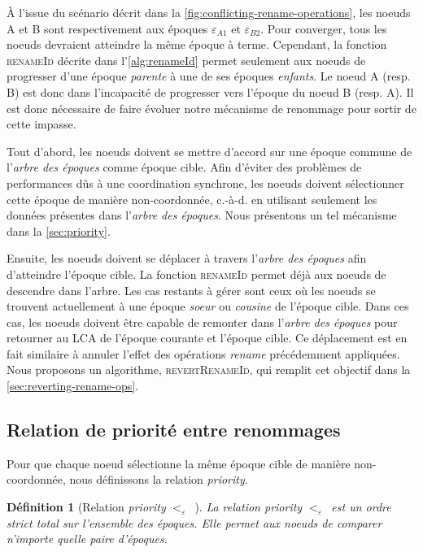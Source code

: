 \documentclass[12pt]{thesul}
\newtheorem{definition}{Définition}
\newcommand{\ie}{c.-à-d. }
\newcommand{\epoch}[1]{$\varepsilon_{#1}$}
\newcommand{\lepoch}{$<_{\varepsilon}$~}
\begin{document}
À l'issue du scénario décrit dans la \autoref{fig:conflicting-rename-operations}, les noeuds A et B sont respectivement aux époques \epoch{A1} et \epoch{B2}.
Pour converger, tous les noeuds devraient atteindre la même époque à terme.
Cependant, la fonction \textsc{renameId} décrite dans l'\autoref{alg:renameId} permet seulement aux noeuds de progresser d'une époque \emph{parente} à une de ses époques \emph{enfants}.
Le noeud A (resp. B) est donc dans l'incapacité de progresser vers l'époque du noeud B (resp. A).
Il est donc nécessaire de faire évoluer notre mécanisme de renommage pour sortir de cette impasse.

Tout d'abord, les noeuds doivent se mettre d'accord sur une époque commune de l'\emph{arbre des époques} comme époque cible.
Afin d'éviter des problèmes de performances dûs à une coordination synchrone, les noeuds doivent sélectionner cette époque de manière non-coordonnée, \ie en utilisant seulement les données présentes dans l'\emph{arbre des époques}.
Nous présentons un tel mécanisme dans la \autoref{sec:priority}.

Ensuite, les noeuds doivent se déplacer à travers l'\emph{arbre des époques} afin d'atteindre l'époque cible.
La fonction \textsc{renameId} permet déjà aux noeuds de descendre dans l'arbre.
Les cas restants à gérer sont ceux où les noeuds se trouvent actuellement à une époque \emph{soeur} ou \emph{cousine} de l'époque cible.
Dans ces cas, les noeuds doivent être capable de remonter dans l'\emph{arbre des époques} pour retourner au \ac{LCA} de l'époque courante et l'époque cible.
Ce déplacement est en fait similaire à annuler l'effet des opérations \emph{rename} précédemment appliquées.
Nous proposons un algorithme, \textsc{revertRenameId}, qui remplit cet objectif dans la \autoref{sec:reverting-rename-ops}.

\subsection{Relation de priorité entre renommages}

\label{sec:priority}

Pour que chaque noeud sélectionne la même époque cible de manière non-coordonnée, nous définissons la relation \emph{priority}.

\begin{definition}[Relation \emph{priority} \lepoch]
  La relation \emph{priority} \lepoch est un ordre strict total sur l'ensemble des époques.
  Elle permet aux noeuds de comparer n'importe quelle paire d'époques.
\end{definition}
\end{document}
